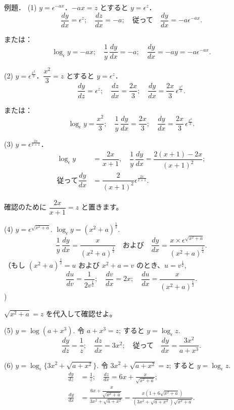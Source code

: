 \documentclass[a4paper,11pt,openany]{ltjsbook}
\begin{document}
例題．
(1) $y=\epsilon^{-ax}$．$-ax=z$ とすると $y=\epsilon^z$．
\[
\dfrac{dy}{dx} = \epsilon^z;\quad
\dfrac{dz}{dx} = -a;\quad\text{従って}\quad
\dfrac{dy}{dx} = -a\epsilon^{-ax}.
\]

または：
\[
\log_\epsilon y = -ax;\quad
\dfrac{1}{y}\, \dfrac{dy}{dx} = -a;\quad
\dfrac{dy}{dx} = -ay = -a\epsilon^{-ax}.
\]

(2) $y=\epsilon^{\frac{x^2}{3}}$．$\dfrac{x^2}{3}=z$ とすると $y=\epsilon^z$．
\[
\dfrac{dy}{dz} = \epsilon^z;\quad
\dfrac{dz}{dx} = \dfrac{2x}{3};\quad
\dfrac{dy}{dx} = \dfrac{2x}{3}\, \epsilon^{\frac{x^2}{3}}.
\]

または：
\[
\log_\epsilon y = \dfrac{x^2}{3};\quad
\dfrac{1}{y}\, \dfrac{dy}{dx} = \dfrac{2x}{3};\quad
\dfrac{dy}{dx} = \dfrac{2x}{3}\, \epsilon^{\frac{x^2}{3}}.
\]

(3) $y = \epsilon^{\frac{2x}{x+1}}$．
\begin{align*}
\log_\epsilon y &= \dfrac{2x}{x+1},\quad
\dfrac{1}{y}\, \dfrac{dy}{dx} = \dfrac{2(x+1)-2x}{(x+1)^2}; \\
従って
\dfrac{dy}{dx} &= \dfrac{2}{(x+1)^2} \epsilon^{\frac{2x}{x+1}}.
\end{align*}

確認のために $\dfrac{2x}{x+1}=z$ と置きます。

(4) \( y = \epsilon^{\sqrt{x^2+a}} \). \quad \(\log_\epsilon y = (x^2+a)^{\frac{1}{2}}\).
\[
\frac{1}{y} \, \frac{dy}{dx} = \frac{x}{(x^2+a)^{\frac{1}{2}}} \quad \text{および} \quad
\frac{dy}{dx} = \frac{x \times \epsilon^{\sqrt{x^2+a}}}{(x^2+a)^{\frac{1}{2}}}.
\]
（もし \( (x^2+a)^{\frac{1}{2}} = u \) および \( x^2+a = v \) のとき、\( u = v^{\frac{1}{2}} \),
\[
\frac{du}{dv} = \frac{1}{2v^{\frac{1}{2}}} ; \quad
\frac{dv}{dx} = 2x ; \quad
\frac{du}{dx} = \frac{x}{(x^2+a)^{\frac{1}{2}}}.
\])

\(\sqrt{x^2+a} = z\) を代入して確認せよ。

(5) \( y = \log(a+x^3) \). 令 \( a+x^3 = z \); すると \( y = \log_\epsilon z \).
\[
\frac{dy}{dz} = \frac{1}{z}; \quad
\frac{dz}{dx} = 3x^2; \quad \text{従って}\quad
\frac{dy}{dx} = \frac{3x^2}{a+x^3}.
\]

(6) \( y = \log_\epsilon \{3x^2 + \sqrt{a+x^2}\} \). 令 \( 3x^2 + \sqrt{a+x^2} = z \);
すると \( y = \log_\epsilon z \).
\begin{align*}
\frac{dy}{dz} &= \frac{1}{z}; \quad \frac{dz}{dx} = 6x + \frac{x}{\sqrt{x^2+a}}; \\
\frac{dy}{dx} &= \frac{6x + \dfrac{x}{\sqrt{x^2+a}}}{3x^2 + \sqrt{a+x^2}}
             = \frac{x(1 + 6\sqrt{x^2+a})}{(3x^2 + \sqrt{a+x^2}) \sqrt{x^2+a}}.
\end{align*}
\end{document}
